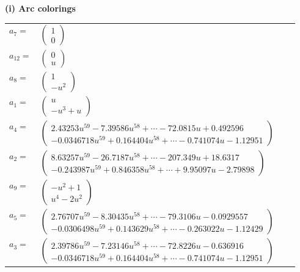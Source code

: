 \documentclass[1p]{elsarticle_modified}
\theoremstyle{definition}
\begin{document}
\flushleft \textbf{(i) Arc colorings}\\
\begin{tabular}{m{7pt} m{180pt} m{7pt} m{180pt} }
\flushright $a_{7}=$&$\begin{pmatrix}1\\0\end{pmatrix}$ \\
\flushright $a_{12}=$&$\begin{pmatrix}0\\u\end{pmatrix}$ \\
\flushright $a_{8}=$&$\begin{pmatrix}1\\- u^2\end{pmatrix}$ \\
\flushright $a_{1}=$&$\begin{pmatrix}u\\- u^3+u\end{pmatrix}$ \\
\flushright $a_{4}=$&$\begin{pmatrix}2.43253 u^{59}-7.39586 u^{58}+\cdots-72.0815 u+0.492596\\-0.0346718 u^{59}+0.164404 u^{58}+\cdots-0.741074 u-1.12951\end{pmatrix}$ \\
\flushright $a_{2}=$&$\begin{pmatrix}8.63257 u^{59}-26.7187 u^{58}+\cdots-207.349 u+18.6317\\-0.243987 u^{59}+0.846358 u^{58}+\cdots+9.95097 u-2.79898\end{pmatrix}$ \\
\flushright $a_{9}=$&$\begin{pmatrix}- u^2+1\\u^4-2 u^2\end{pmatrix}$ \\
\flushright $a_{5}=$&$\begin{pmatrix}2.76707 u^{59}-8.30435 u^{58}+\cdots-79.3106 u-0.0929557\\-0.0306498 u^{59}+0.143629 u^{58}+\cdots-0.263022 u-1.12429\end{pmatrix}$ \\
\flushright $a_{3}=$&$\begin{pmatrix}2.39786 u^{59}-7.23146 u^{58}+\cdots-72.8226 u-0.636916\\-0.0346718 u^{59}+0.164404 u^{58}+\cdots-0.741074 u-1.12951\end{pmatrix}$ \\

\end{tabular}
\end{document}
